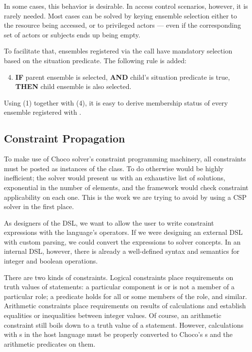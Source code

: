 In some cases, this behavior is desirable. In access control scenarios, however, it is
rarely needed. Most cases can be solved by keying ensemble selection either to the
resource being accessed, or to privileged actors --- even if the corresponding set of
actors or subjects ends up being empty.

To facilitate that, ensembles registered via the  call have mandatory
selection based on the situation predicate. The following rule is added:

\begin{enumerate}
\setcounter{enumi}{3}
\item \textbf{IF} parent ensemble is selected, \textbf{AND} child's situation predicate
is true, \textbf{THEN} child ensemble is also selected.
\end{enumerate}

Using (1) together with (4), it is easy to derive membership status of every ensemble
registered with .


\subsection{Constraint Propagation}
\label{impl:solver:constraints}

To make use of Choco solver's constraint programming machinery, all constraints must be
posted as instances of the  class. To do otherwise would be highly
inefficient; the solver would present us with an exhaustive list of solutions,
exponential in the number of elements, and the framework would check constraint
applicability on each one. This is the work we are trying to avoid by using a CSP solver
in the first place.

As designers of the DSL, we want to allow the user to write constraint expressions with
the language's operators. If we were designing an external DSL with custom parsing, we
could convert the expressions to solver concepts. In an internal DSL, however, there is
already a well-defined syntax and semantics for integer and boolean operations.

There are two kinds of constraints. Logical constraints place requirements on truth
values of statements: a particular component is or is not a member of a particular role;
a predicate holds for all or some members of the role, and similar. Arithmetic
constraints place requirements on results of calculations and establish equalities or
inequalities between integer values. Of course, an arithmetic constraint still boils
down to a truth value of a statement. However, calculations with s in the host
language must be properly converted to Choco's s and the arithmetic
predicates on them.

